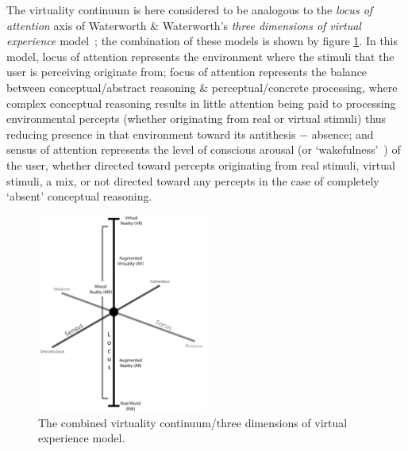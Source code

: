 \documentclass[conference]{acmsiggraph}
\begin{document}
The virtuality continuum is here considered to be analogous to the \textit{locus of attention} axis of Waterworth \& Waterworth's \textit{three dimensions of virtual experience} model~\cite{Waterworth2001}; the combination of these models is shown by figure \ref{focus-locus-sensus-with-virtuality-continuum}. In this model, locus of attention represents the environment where the stimuli that the user is perceiving originate from; focus of attention represents the balance between conceptual/abstract reasoning \& perceptual/concrete processing, where complex conceptual reasoning results in little attention being paid to processing environmental percepts (whether originating from real or virtual stimuli) thus reducing presence\presencefootnote{} in that environment toward its antithesis $-$ absence\absencefootnote{}; and sensus of attention represents the level of conscious arousal (or `wakefulness'~\cite{Laureys2009}) of the user, whether directed toward percepts originating from real stimuli, virtual stimuli, a mix, or not directed toward any percepts in the case of completely `absent' conceptual reasoning.

\begin{figure}[h]
	\begin{center}
		\includegraphics[width=0.5\textwidth]{images/focus-locus-sensus-with-virtuality-continuum.png}
		\caption{The combined virtuality continuum/three dimensions of virtual experience model.}
		\label{focus-locus-sensus-with-virtuality-continuum}
	\end{center}	
\end{figure}

\end{document}
